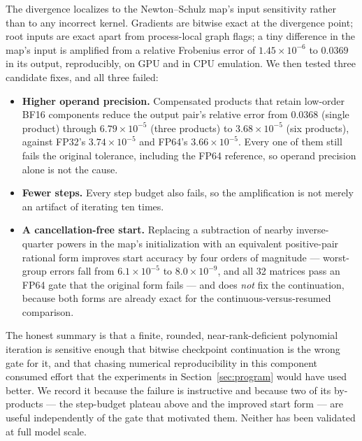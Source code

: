The divergence localizes to the Newton--Schulz map's input sensitivity rather
than to any incorrect kernel. Gradients are bitwise exact at the divergence
point; root inputs are exact apart from process-local graph flags; a tiny
difference in the map's input is amplified from a relative Frobenius error of
$1.45\times10^{-6}$ to $0.0369$ in its output, reproducibly, on GPU and in CPU
emulation. We then tested three candidate fixes, and all three failed:
\begin{itemize}\setlength{\itemsep}{1pt}\setlength{\parskip}{0pt}\setlength{\topsep}{3pt}
\item \textbf{Higher operand precision.} Compensated products that retain
  low-order BF16 components reduce the output pair's relative error from
  $0.0368$ (single product) through $6.79\times10^{-5}$ (three products) to
  $3.68\times10^{-5}$ (six products), against FP32's $3.74\times10^{-5}$ and
  FP64's $3.66\times10^{-5}$. Every one of them still fails the original
  tolerance, including the FP64 reference, so operand precision alone is not the
  cause.
\item \textbf{Fewer steps.} Every step budget also fails, so the amplification
  is not merely an artifact of iterating ten times.
\item \textbf{A cancellation-free start.} Replacing a subtraction of nearby
  inverse-quarter powers in the map's initialization with an equivalent
  positive-pair rational form improves start accuracy by four orders of
  magnitude --- worst-group errors fall from $6.1\times10^{-5}$ to
  $8.0\times10^{-9}$, and all 32 matrices pass an FP64 gate that the original
  form fails --- and does \emph{not} fix the continuation, because both forms
  are already exact for the continuous-versus-resumed comparison.
\end{itemize}

The honest summary is that a finite, rounded, near-rank-deficient polynomial
iteration is sensitive enough that bitwise checkpoint continuation is the wrong
gate for it, and that chasing numerical reproducibility in this component
consumed effort that the experiments in Section~\ref{sec:program} would have
used better. We record it because the failure is instructive and because two
of its by-products --- the step-budget plateau above and the improved start
form --- are useful independently of the gate that motivated them. Neither has
been validated at full model scale.
